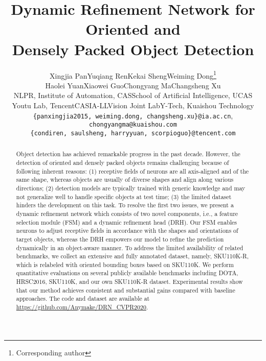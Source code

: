 \documentclass[10pt,twocolumn,letterpaper]{article}
\begin{document}
\title{Dynamic Refinement Network for Oriented and\\ Densely Packed Object Detection}

\author{Xingjia Pan\quad Yuqiang Ren\quad Kekai Sheng\quad Weiming Dong\thanks{Corresponding author}  \\
Haolei Yuan\quad Xiaowei Guo\quad Chongyang Ma\quad Changsheng Xu\\
NLPR, Institute of Automation, CAS\quad School of Artificial Intelligence, UCAS \\Youtu Lab, Tencent\quad CASIA-LLVision Joint Lab\quad Y-Tech, Kuaishou Technology\\
{\tt\small \{panxingjia2015, weiming.dong, changsheng.xu\}@ia.ac.cn}, {\tt\small chongyangma@kuaishou.com} \\
{\tt\small \{condiren, saulsheng, harryyuan, scorpioguo\}@tencent.com}
}

\maketitle


\begin{abstract}
Object detection has achieved remarkable progress in the past decade. However, the detection of oriented and densely packed objects remains challenging because of following inherent reasons: (1) receptive fields of neurons are all axis-aligned and of the same shape, whereas objects are usually of diverse shapes and align along various directions; (2) detection models are typically trained with generic knowledge and may not generalize well to handle specific objects at test time; (3) the limited dataset hinders the development on this task.
To resolve the first two issues, we present a dynamic refinement network which consists of two novel components, i.e., a feature selection module (FSM) and a dynamic refinement head (DRH).
Our FSM enables neurons to adjust receptive fields in accordance with the shapes and orientations of target objects, whereas the DRH empowers our model to refine the prediction dynamically in an object-aware manner.
To address the limited availability of related benchmarks, we collect an extensive and fully annotated dataset, namely, SKU110K-R, which is relabeled with oriented bounding boxes based on SKU110K.
We perform quantitative evaluations on several publicly available benchmarks including DOTA, HRSC2016, SKU110K, and our own SKU110K-R dataset.
Experimental results show that our method achieves consistent and substantial gains compared with baseline approaches.
The code and dataset are available at \url{https://github.com/Anymake/DRN_CVPR2020}.
\end{abstract}
\end{document}
